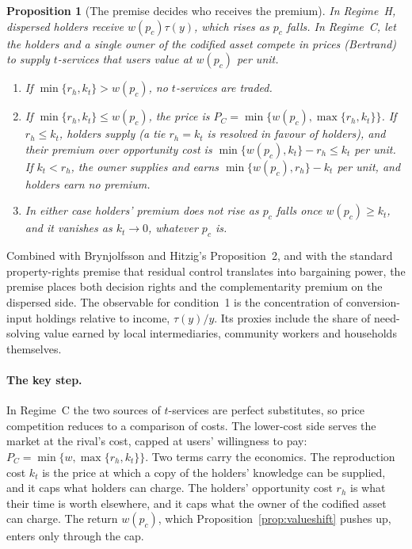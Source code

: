 \documentclass[12pt]{article}
\newtheorem{proposition}{Proposition}
\theoremstyle{remark}
\begin{document}
\begin{proposition}[The premise decides who receives the premium]\label{prop:regime}
In Regime~H, dispersed holders receive $w(p_c)\tau(y)$, which rises as $p_c$ falls. In Regime~C, let the holders and a single owner of the codified asset compete in prices (Bertrand) to supply $t$-services that users value at $w(p_c)$ per unit.
\begin{enumerate}[label=(\roman*),itemsep=0pt]
\item If $\min\{r_h,k_t\}>w(p_c)$, no $t$-services are traded.
\item If $\min\{r_h,k_t\}\le w(p_c)$, the price is $P_C=\min\{w(p_c),\max\{r_h,k_t\}\}$. If $r_h\le k_t$, holders supply (a tie $r_h=k_t$ is resolved in favour of holders), and their premium over opportunity cost is $\min\{w(p_c),k_t\}-r_h\le k_t$ per unit. If $k_t<r_h$, the owner supplies and earns $\min\{w(p_c),r_h\}-k_t$ per unit, and holders earn no premium.
\item In either case holders' premium does not rise as $p_c$ falls once $w(p_c)\ge k_t$, and it vanishes as $k_t\to0$, whatever $p_c$ is.
\end{enumerate}
\end{proposition}

Combined with Brynjolfsson and Hitzig's Proposition~2, and with the standard property-rights premise that residual control translates into bargaining power, the premise places both decision rights and the complementarity premium on the dispersed side. The observable for condition~1 is the concentration of conversion-input holdings relative to income, $\tau(y)/y$. Its proxies include the share of need-solving value earned by local intermediaries, community workers and households themselves.

\paragraph{The key step.} In Regime~C the two sources of $t$-services are perfect substitutes, so price competition reduces to a comparison of costs. The lower-cost side serves the market at the rival's cost, capped at users' willingness to pay: $P_C=\min\{w,\max\{r_h,k_t\}\}$. Two terms carry the economics. The reproduction cost $k_t$ is the price at which a copy of the holders' knowledge can be supplied, and it caps what holders can charge. The holders' opportunity cost $r_h$ is what their time is worth elsewhere, and it caps what the owner of the codified asset can charge. The return $w(p_c)$, which Proposition~\ref{prop:valueshift} pushes up, enters only through the cap.
\end{document}
